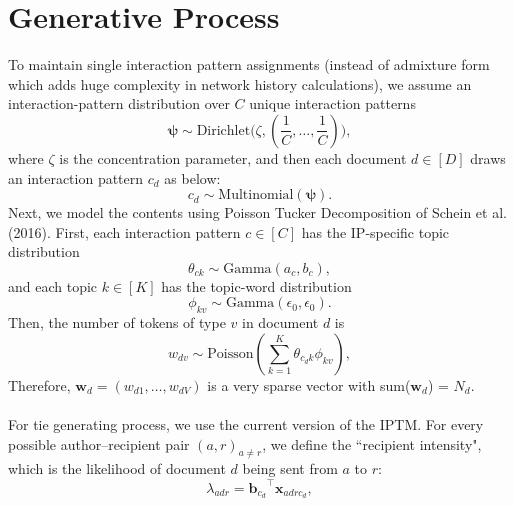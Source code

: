 \documentclass[11pt]{article}
\begin{document}
\maketitle


\section{Generative Process}
To maintain single interaction pattern assignments (instead of admixture form which adds huge complexity in network history calculations), we assume an interaction-pattern distribution over $C$ unique interaction patterns
\begin{equation}
\boldsymbol{\psi}\sim \mbox{Dirichlet}\Big(\zeta, (\frac{1}{C},\ldots,\frac{1}{C})\Big),
\end{equation}
where $\zeta$ is the concentration parameter, and then each document $d \in [D]$ draws an interaction pattern $c_d$ as below:
\begin{equation}
c_d\sim \mbox{Multinomial}(\boldsymbol{\psi}).
\end{equation}
Next, we model the contents using Poisson Tucker Decomposition of Schein et al. (2016). First, each interaction pattern $c \in [C]$ has the IP-specific topic distribution
\begin{equation}
\theta_{ck} \sim \mbox{Gamma}(a_c,b_c),
\end{equation}
and each topic $k\in[K]$ has the topic-word distribution
\begin{equation}
\phi_{kv} \sim \mbox{Gamma}(\epsilon_0,\epsilon_0).
\end{equation}
Then, the number of tokens of type $v$ in document $d$ is
\begin{equation}
w_{dv} \sim \mbox{Poisson}(\sum_{k=1}^K \theta_{c_dk}\phi_{kv}),
\end{equation}
Therefore, $\boldsymbol{w}_d = (w_{d1},\ldots,w_{dV})$ is a very sparse vector with sum($\boldsymbol{w}_d$) = $N_d$. \\ \\
For tie generating process, we use the current version of the IPTM. For every possible author--recipient pair $(a,r)_{a \neq r}$, we define the ``recipient intensity", which is the likelihood of document $d$ being sent from $a$ to $r$:
\begin{equation}
\lambda_{adr} = {\boldsymbol{b}_{c_d}}^{\top}\boldsymbol{x}_{adrc_d},
\end{equation}
\end{document}
